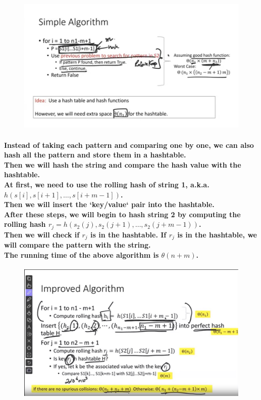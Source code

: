 \documentclass{article}
\begin{document}
\begin{figure}[H]
    \includegraphics[width=\textwidth]{stringmatchingproblem2simplealgo.png}
\end{figure}

\paragraph{
    Instead of taking each pattern and comparing one by one, we can also hash all the pattern and store them in a hashtable.\\
    Then we will hash the string and compare the hash value with the hashtable.\\
    At first, we need to use the rolling hash of string 1, a.k.a. $h(s[i], s[i+1], \ldots, s[i+m-1])$.\\
    Then we will insert the `key/value` pair into the hashtable.\\
    After these steps, we will begin to hash string 2 by computing the rolling hash 
    $r_j= h(s_2(j), s_2(j+1), \ldots, s_2(j+m-1))$.\\
    Then we will check if $r_j$ is in the hashtable. If $r_j$ is in the hashtable, we will compare the pattern with the string.\\
    The running time of the above algorithm is $\theta(n+m)$.\\
}

\begin{figure}[H]
    \includegraphics[width=\textwidth]{stringmatchingproblem2improvedalgo.png}
\end{figure}
\end{document}
